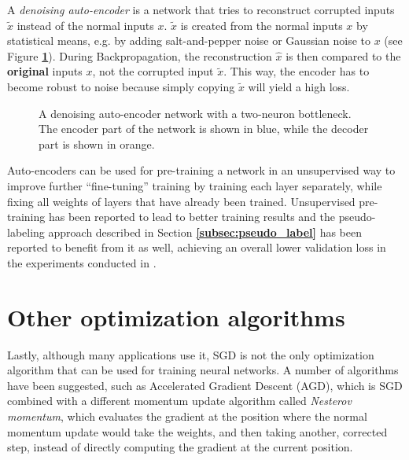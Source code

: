 A \textit{denoising auto-encoder} is a network that tries to reconstruct corrupted inputs $\widetilde{x}$ instead of the normal inputs $x$. $\widetilde{x}$ is created from the normal inputs $x$ by statistical means, e.g. by adding salt-and-pepper noise or Gaussian noise to $x$ (see Figure \textbf{\ref{fig:auto_encoder}}). During Backpropagation, the reconstruction $\hat{x}$ is then compared to the \textbf{original} inputs $x$, not the corrupted input $\widetilde{x}$. This way, the encoder has to become robust to noise because simply copying $\widetilde{x}$ will yield a high loss. \cite{autoencoder, denoising_autoencoder}\\

\begin {figure}[!htb]
	\begin{center}
		\scalebox{0.70}{}
	\end{center}

		\caption[A denoising auto-encoder.]{A denoising auto-encoder network with a two-neuron bottleneck. The encoder part of the network is shown in blue, while the decoder part is shown in orange.}
		\label{fig:auto_encoder}
\end {figure}

Auto-encoders can be used for pre-training a network in an unsupervised way to improve further ``fine-tuning'' training by training each layer separately, while fixing all weights of layers that have already been trained. Unsupervised pre-training has been reported to lead to better training results \cite{pretraining} and the pseudo-labeling approach described in Section \textbf{\ref{subsec:pseudo_label}} has been reported to benefit from it as well, achieving an overall lower validation loss in the experiments conducted in \cite{pseudo_label}.


	\section{Other optimization algorithms}

Lastly, although many applications use it, SGD is not the only optimization algorithm that can be used for training neural networks. A number of algorithms have been suggested, such as Accelerated Gradient Descent (AGD), which is SGD combined with a different momentum update algorithm called \textit{Nesterov momentum}, which evaluates the gradient at the position where the normal momentum update would take the weights, and then taking another, corrected step, instead of directly computing the gradient at the current position. \cite{nesterov}

